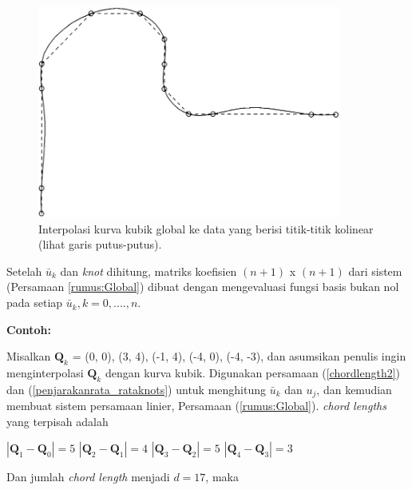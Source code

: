 \begin{figure}[H]
	\centering
	\includegraphics[keepaspectratio, width=10cm]{gambar/Interpolasi/pic9.png}
	\caption{Interpolasi kurva kubik global 
	ke data yang berisi titik-titik kolinear 
	(lihat garis putus-putus).}
	\label{gambar:interpolasi4}
\end{figure}
Setelah $\bar{u}_k$ dan \textit{knot} dihitung, matriks koefisien 
$(n+1)$ x $(n+1)$ dari sistem (Persamaan \ref{rumus:Global}) 
dibuat dengan mengevaluasi fungsi basis bukan nol pada 
setiap $\bar{u}_k, k = 0, . ..., n$.

\textbf{Contoh:}

Misalkan {$\textbf{Q}_k$} = {(0, 0), (3, 4), (-1, 4), 
(-4, 0), (-4, -3)}, dan asumsikan penulis ingin 
menginterpolasi $\textbf{Q}_k$ dengan kurva kubik. 
Digunakan persamaan (\ref{chordlength2}) dan 
(\ref{penjarakanrata_rataknots}) untuk menghitung 
$\bar{u}_k$ dan $u_j$, dan kemudian membuat sistem persamaan 
linier, Persamaan (\ref{rumus:Global}). \textit{chord lengths} 
yang terpisah adalah

\centerline{$|\textbf{Q}_1 - \textbf{Q}_0| = 5$ \quad
$|\textbf{Q}_2 - \textbf{Q}_1| = 4$ \quad
$|\textbf{Q}_3 - \textbf{Q}_2| = 5$ \quad
$|\textbf{Q}_4 - \textbf{Q}_3| = 3$}

Dan jumlah \textit{chord length} menjadi $d = 17$, maka

